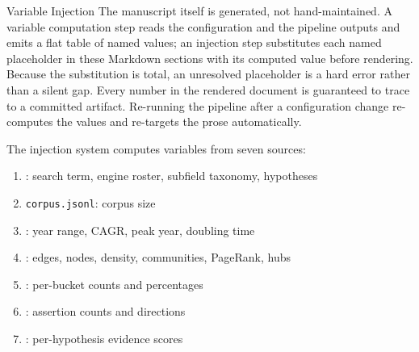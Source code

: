 \documentclass[
  ignorenonframetext,
]{beamer}
\providecommand{\tightlist}{%
  \setlength{\itemsep}{0pt}\setlength{\parskip}{0pt}}
\begin{document}
\begin{frame}{Variable Injection}
\label{variable-injection}
The manuscript itself is generated, not hand-maintained. A variable
computation step reads the configuration and the pipeline outputs and
emits a flat table of named values; an injection step substitutes each
named placeholder in these Markdown sections with its computed value
before rendering. Because the substitution is total, an unresolved
placeholder is a hard error rather than a silent gap. Every number in
the rendered document is guaranteed to trace to a committed artifact.
Re-running the pipeline after a configuration change re-computes the
values and re-targets the prose automatically.

The injection system computes variables from seven sources:

\begin{enumerate}
\tightlist
\item
  : search term, engine roster, subfield
  taxonomy, hypotheses
\item
  \texttt{corpus.jsonl}: corpus size
\item
  : year range, CAGR, peak year,
  doubling time
\item
  : edges, nodes, density, communities,
  PageRank, hubs
\item
  : per-bucket counts and
  percentages
\item
  : assertion counts and directions
\item
  : per-hypothesis evidence scores
\end{enumerate}
\end{frame}
\end{document}
